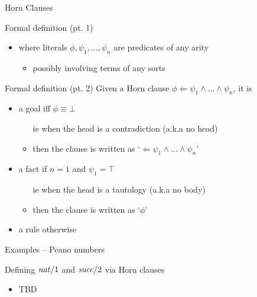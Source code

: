 \documentclass[presentation]{beamer}\mode<presentation>{\usetheme{AMSBolognaFC}}
\begin{document}
\begin{frame}[allowframebreaks]{Horn Clauses}
\begin{block}{Formal definition (pt. 1)}
\begin{itemize}
\begin{itemize}
            \end{itemize}
            \item where literals $\phi, \psi_1, \ldots, \psi_n$ are \alert{predicates} of any arity
            \begin{itemize}
                \item possibly involving terms of any sorts
            \end{itemize}
        \end{itemize}
    \end{block}
    \begin{block}{Formal definition (pt. 2)}
        Given a Horn clause $\phi \Leftarrow \psi_1 \wedge \ldots \wedge \psi_n$, it is
        \begin{itemize}
            \item a \alert{goal} iff $\phi \equiv \bot$
            \begin{itemize}
                \item[ie] when the head is a contradiction (a.k.a no head)
                \item then the clause is written as `$\Leftarrow \psi_1 \wedge \ldots \wedge \psi_n$'
            \end{itemize}

            \item a \alert{fact} if $n = 1$ and $\psi_1 = \top$
            \begin{itemize}
                \item[ie] when the head is a tautology (a.k.a no body)
                \item then the clause is written as `$\phi$'
            \end{itemize}

            \item a \alert{rule} otherwise
        \end{itemize}
    \end{block}
\end{frame}

\begin{frame}{Examples -- Peano numbers}
    \begin{exampleblock}{Defining $\mathit{nat}/1$ and $\mathit{succ}/2$ via Horn clauses}
        \begin{itemize}
            \item TBD
        \end{itemize}
    \end{exampleblock}
\end{frame}
\end{document}
